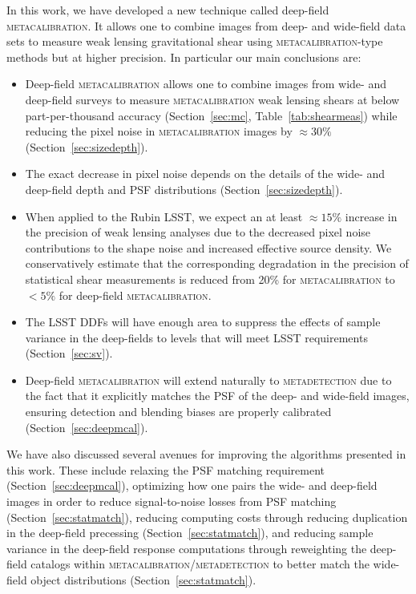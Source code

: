 \documentclass[twocolumn]{openjournal}
\makeatletter
\newcommand{\mdet}{\textsc{metadetection}\@\xspace}
\newcommand{\mcal}{\textsc{metacalibration}\@\xspace}
\makeatother
\begin{document}
In this work, we have developed a new technique called deep-field \mcal. It allows one
to combine images from deep- and wide-field data sets to measure weak lensing
gravitational shear using \mcal-type methods but at higher precision. In particular our main
conclusions are:
\begin{itemize}
  \item Deep-field \mcal allows one to combine images from wide- and deep-field surveys
    to measure \mcal weak lensing shears at below part-per-thousand accuracy
    (Section~\ref{sec:mc}, Table~\ref{tab:shearmeas}) while reducing the pixel noise
    in \mcal images by $\approx30\%$ (Section~\ref{sec:sizedepth}).
  \item The exact decrease in pixel noise depends on the details of
    the wide- and deep-field depth and PSF distributions (Section~\ref{sec:sizedepth}).
  \item When applied to the Rubin LSST, we expect an at least $\approx15\%$ increase in
    the precision of weak lensing analyses due to the decreased pixel noise contributions
    to the shape noise and increased effective source density.  We conservatively
    estimate that the corresponding degradation in the precision of statistical
    shear measurements is reduced from 20\% for \mcal to $<5\%$ for deep-field \mcal.
  \item The LSST DDFs will have enough area to suppress the effects of sample variance
    in the deep-fields to levels that will meet LSST requirements
    (Section~\ref{sec:sv}).
  \item Deep-field \mcal will extend naturally to \mdet due to the fact that it
    explicitly matches the PSF of the deep- and wide-field images, ensuring detection
    and blending biases are properly calibrated (Section~\ref{sec:deepmcal}).
\end{itemize}

We have also discussed several avenues for improving the algorithms presented in this
work. These include relaxing the PSF matching requirement (Section~\ref{sec:deepmcal}),
optimizing how one pairs the wide- and deep-field images in order to reduce
signal-to-noise losses from PSF matching (Section~\ref{sec:statmatch}), reducing
computing costs through reducing duplication in the deep-field precessing
(Section~\ref{sec:statmatch}), and reducing sample variance in the deep-field response
computations through reweighting the deep-field catalogs within \mcal/\mdet to better
match the wide-field object distributions (Section~\ref{sec:statmatch}).
\end{document}
